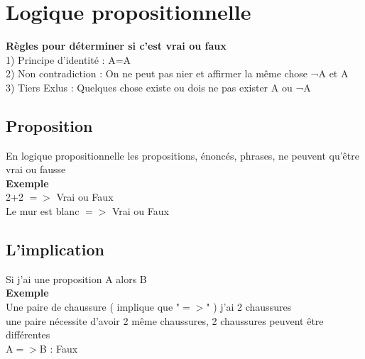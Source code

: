 \newpage

\chapter{Logique propositionnelle}
\vspace{5mm} %

\textbf{Règles pour déterminer si c'est vrai ou faux} \\

1) Principe d'identité : A=A \\

2) Non contradiction : On ne peut pas nier et affirmer la même chose ¬A et A \\

3) Tiers Exlus : Quelques chose existe ou dois ne pas exister A ou ¬A \\


\section{Proposition}
\vspace{5mm} %

En logique propositionnelle les propositions, énoncés, phrases, ne peuvent qu'être vrai ou fausse \\

\textbf{Exemple}\\

2+2 $=>$ Vrai ou Faux \\

Le mur est blanc $=>$ Vrai ou Faux \\

\section{L'implication}
\vspace{5mm} %

Si j'ai une proposition A alors B \\

\textbf{Exemple} \\

Une paire de chaussure ( implique que "$=>$" ) j'ai 2 chaussures \\

une paire nécessite d'avoir 2 même chaussures, 2 chaussures peuvent être différentes \\

A$=>$B : Faux \\

